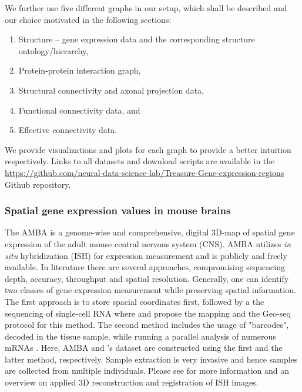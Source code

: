 \documentclass[]{article}
\renewcommand{\cite}{\citep}
\newcommand{\Github}{https://github.com/neural-data-science-lab/Treasure-Gene-expression-regions}
\begin{document}
We further use five different graphs in our setup, which shall be described and our choice motivated in the following sections:
\begin{enumerate}
	\item Structure -- gene expression data and the corresponding structure ontology/hierarchy, 
	\item Protein-protein interaction graph,
	\item Structural connectivity and axonal projection data, 
	\item Functional connectivity data, and
	\item Effective connectivity data.
\end{enumerate}

We provide visualizations and plots for each graph to provide a better intuition respectively. Links to all datasets and download scripts are available in the \href{\Github}{\Github} Github repository.

\subsubsection{Spatial gene expression values in mouse brains}
\label{sec:geneexp_data}

The AMBA\cite{MouseBrainAtlas} is a genome-wise and comprehensive, digital 3D-map of spatial gene expression of the adult mouse central nervous system (CNS). AMBA utilizes \textit{in situ} hybridization (ISH) for expression measurement and is publicly and freely available. 
In literature there are several approaches, compromising sequencing depth, accuracy, throughput and spatial resolution. Generally, one can identify two classes of gene expression measurement while preserving spatial information. The first approach is to store spacial coordinates first, followed by a the sequencing of single-cell RNA where \citet{achim2015high} and \citet{chen2017spatial} propose the mapping and the Geo-seq protocol for this method. The second method includes the usage of "barcodes", decoded in the tissue sample, while running a parallel analysis of numerous mRNAs \cite{ke2013situ, moffitt2016high}. Here, AMBA and \citet{Partel2020}'s dataset are constructed using the first and the latter method, respectively. Sample extraction is very invasive and hence samples are collected from multiple individuals. Please see \citet{ng2007neuroinformatics} for more information and an overview on applied 3D reconstruction and registration of ISH images.\\
\end{document}
